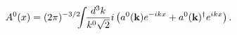 \begin{equation}
A^0(x) = (2\pi)^{-3/2} \!\!\!\int\!\! \frac{d^3k}{k^0 \sqrt{2}} 
i \left( a^0({\mathbf{k}}) e^{-ikx} 
+ a^0({\mathbf{k}})^\dagger e^{ikx} \right). \nonumber \\
\label{4-9}
\end{equation}

